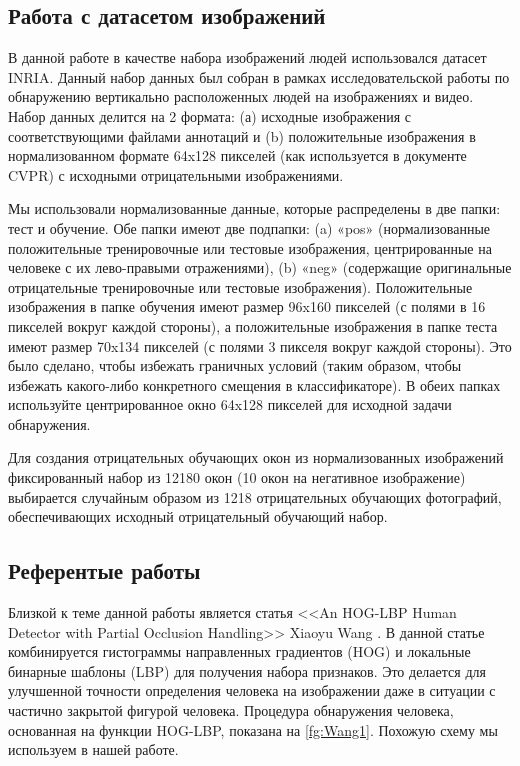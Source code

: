 \documentclass[12pt,twoside]{article}
\begin{document}
\subsection{Работа с датасетом изображений}
В данной работе в качестве набора изображений людей использовался датасет INRIA\cite{inria}. Данный набор данных был собран в рамках исследовательской работы по обнаружению вертикально расположенных людей на изображениях и видео\cite{dalaltriggs2005}. Набор данных делится на 2 формата: (а) исходные изображения с соответствующими файлами аннотаций и (b) положительные изображения в нормализованном формате 64x128 пикселей (как используется в документе CVPR) с исходными отрицательными изображениями.

Мы использовали нормализованные данные, которые распределены в две папки: тест и обучение. Обе папки имеют две подпапки: (a) «pos» (нормализованные положительные тренировочные или тестовые изображения, центрированные на человеке с их лево-правыми отражениями), (b) «neg» (содержащие оригинальные отрицательные тренировочные или тестовые изображения). Положительные изображения в папке обучения имеют размер 96x160 пикселей (с полями в 16 пикселей вокруг каждой стороны), а положительные изображения в папке теста имеют размер 70x134 пикселей (с полями 3 пикселя вокруг каждой стороны). Это было сделано, чтобы избежать граничных условий (таким образом, чтобы избежать какого-либо конкретного смещения в классификаторе). В обеих папках используйте центрированное окно 64x128 пикселей для исходной задачи обнаружения.

Для создания отрицательных обучающих окон из нормализованных изображений фиксированный набор из 12180 окон (10 окон на негативное изображение) выбирается случайным образом из 1218 отрицательных обучающих фотографий, обеспечивающих исходный отрицательный обучающий набор.

\subsection{Референтые работы}
Близкой к теме данной работы является статья <<An HOG-LBP Human Detector with Partial Occlusion Handling>> Xiaoyu Wang \cite{Wang09}. В данной статье комбинируется гистограммы направленных градиентов (HOG) и локальные бинарные шаблоны (LBP) для получения набора признаков. Это делается для улучшенной точности определения человека на изображении даже в ситуации с частично закрытой фигурой человека. Процедура обнаружения человека, основанная на функции HOG-LBP, показана на \ref{fg:Wang1}. Похожую схему мы используем в нашей работе. 
\end{document}
